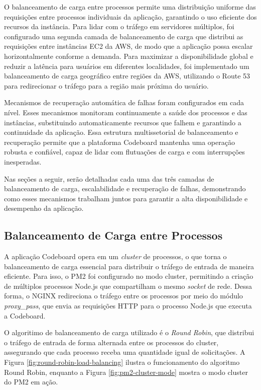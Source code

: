O balanceamento de carga entre processos permite uma distribuição uniforme das requisições entre processos individuais da aplicação, garantindo o uso eficiente dos recursos da instância. Para lidar com o tráfego em servidores múltiplos, foi configurado uma segunda camada de balanceamento de carga que distribui as requisições entre instâncias EC2 da AWS, de modo que a aplicação possa escalar horizontalmente conforme a demanda. Para maximizar a disponibilidade global e reduzir a latência para usuários em diferentes localidades, foi implementado um balanceamento de carga geográfico entre regiões da AWS, utilizando o Route 53 para redirecionar o tráfego para a região mais próxima do usuário. 

Mecanismos de recuperação automática de falhas foram configurados em cada nível. Esses mecanismos monitoram continuamente a saúde dos processos e das instâncias, substituindo automaticamente recursos que falhem e garantindo a continuidade da aplicação. Essa estrutura multissetorial de balanceamento e recuperação permite que a plataforma Codeboard mantenha uma operação robusta e confiável, capaz de lidar com flutuações de carga e com interrupções inesperadas.

Nas seções a seguir, serão detalhadas cada uma das três camadas de balanceamento de carga, escalabilidade e recuperação de falhas, demonstrando como esses mecanismos trabalham juntos para garantir a alta disponibilidade e desempenho da aplicação.

\subsection{Balanceamento de Carga entre Processos}

A aplicação Codeboard opera em um \emph{cluster} de processos, o que torna o balanceamento de carga essencial para distribuir o tráfego de entrada de maneira eficiente. Para isso, o PM2 foi configurado no modo cluster, permitindo a criação de múltiplos processos Node.js que compartilham o mesmo \emph{socket} de rede. Dessa forma, o NGINX redireciona o tráfego entre os processos por meio do módulo \emph{proxy\_pass}, que envia as requisições HTTP para o processo Node.js que executa a Codeboard.

O algoritimo de balanceamento de carga utilizado é o \emph{Round Robin}, que distribui o tráfego de entrada de forma alternada entre os processos do cluster, assegurando que cada processo receba uma quantidade igual de solicitações. A Figura \ref{fig:round-robin-load-balancing} ilustra o funcionamento do algoritmo Round Robin, enquanto a Figura \ref{fig:pm2-cluster-mode} mostra o modo cluster do PM2 em ação.

